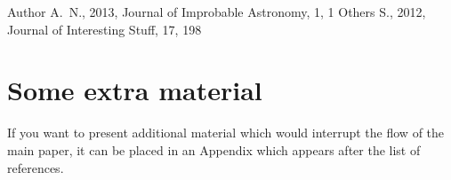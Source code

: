 \documentclass[a4paper,fleqn,usenatbib]{mnras}
\begin{document}
%


\begin{thebibliography}{99}
Author A.~N., 2013, Journal of Improbable Astronomy, 1, 1
Others S., 2012, Journal of Interesting Stuff, 17, 198
\end{thebibliography}



\appendix

\section{Some extra material}

If you want to present additional material which would interrupt the flow of the main paper,
it can be placed in an Appendix which appears after the list of references.



\bsp	%
\label{lastpage}
\end{document}
